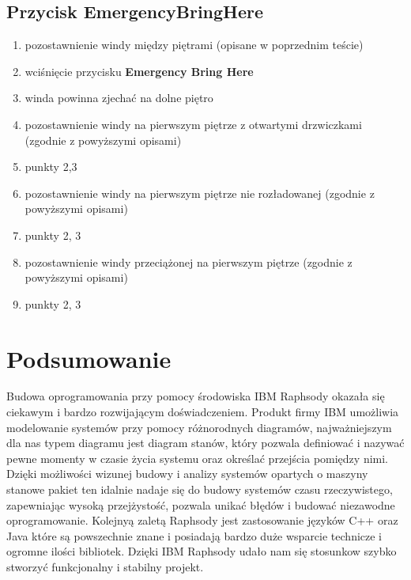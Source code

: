 \documentclass[a4paper,11pt]{article}
\begin{document}
	\subsection{Przycisk EmergencyBringHere}
		\begin{enumerate}
			\item pozostawnienie windy między piętrami (opisane w poprzednim teście)
			\item wciśnięcie przycisku \textbf{Emergency Bring Here}
			\item winda powinna zjechać na dolne piętro
			\item pozostawnienie windy na pierwszym piętrze z otwartymi drzwiczkami (zgodnie z powyższymi opisami)
			\item punkty 2,3
			\item pozostawnienie windy na pierwszym piętrze nie rozładowanej (zgodnie z powyższymi opisami)
			\item punkty 2, 3
			\item pozostawnienie windy przeciążonej na pierwszym piętrze (zgodnie z powyższymi opisami)
			\item punkty 2, 3
		\end{enumerate}


		
	
\section{Podsumowanie}
	Budowa oprogramowania przy pomocy środowiska IBM Raphsody 
	okazała się ciekawym i bardzo rozwijającym doświadczeniem.
	Produkt firmy IBM umożliwia modelowanie systemów przy pomocy różnorodnych diagramów, najważniejszym dla nas
	typem diagramu jest diagram stanów, który pozwala definiować i nazywać pewne momenty w czasie życia systemu oraz określać przejścia pomiędzy nimi.
	Dzięki możliwości wizunej budowy i analizy systemów opartych o maszyny stanowe pakiet ten idalnie 
	nadaje się do budowy systemów czasu rzeczywistego, zapewniając wysoką przejżystość, pozwala unikać błędów i budować niezawodne oprogramowanie.
	Kolejnyą zaletą Raphsody jest zastosowanie 
	języków C++ oraz Java które są powszechnie znane i posiadają bardzo 
	duże wsparcie technicze i ogromne ilości bibliotek.
	Dzięki IBM Raphsody udało nam się stosunkow szybko stworzyć funkcjonalny i stabilny projekt.
\end{document}
